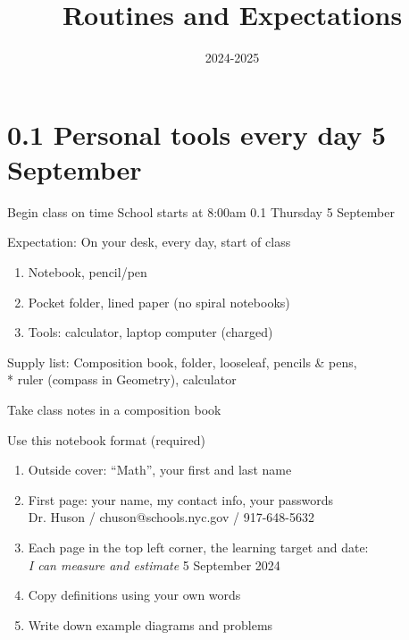 \documentclass[onlytextwidth]{beamer}
\title{Routines and Expectations}
\date{2024-2025}
\begin{document}
\frame{\titlepage}


\section{0.1 Personal tools every day \hfill 5 September}
\begin{frame}{Begin class on time}
  {School starts at 8:00am \hfill \alert{0.1 Thursday 5 September}}
  \begin{block}{Expectation: On your desk, every day, start of class}
  \begin{enumerate}
      \item Notebook, pencil/pen
      \item Pocket folder, lined paper (no spiral notebooks)
      \item Tools: calculator, laptop computer (charged)
  \end{enumerate}
  \end{block}
  Supply list: Composition book, folder, looseleaf, pencils \& pens, \\*
  ruler (compass in Geometry), calculator
  \end{frame}

\begin{frame}{Take class notes in a composition book}
  \begin{block}{Use this notebook format (required)}
    \begin{enumerate}
      \item Outside cover: ``Math'', your first and last name
      \item First page: your name, my contact info, your passwords \\
      \qquad Dr. Huson / chuson@schools.nyc.gov / 917-648-5632 \vspace{0.25cm}
      \item Each page in the top left corner, the learning target and date: \\
      \emph{I can measure and estimate} \hfill 5 September 2024 \vspace{0.25cm}
      \item Copy definitions using your own words
      \item Write down example diagrams and problems
    \end{enumerate}
    \end{block}
  \end{frame}
\end{document}
